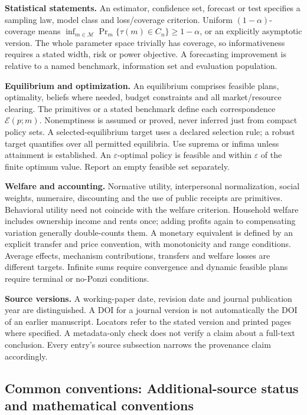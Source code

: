 \documentclass[11pt,a4paper]{article}
\begin{document}
\textbf{Statistical statements.} An estimator, confidence set, forecast or test specifies a sampling law, model class and loss/coverage criterion. Uniform \((1-\alpha)\)-coverage means \(\inf_{m\in\mathcal M}\Pr_m\{\tau(m)\in C_n\}\geq1-\alpha\), or an explicitly asymptotic version. The whole parameter space trivially has coverage, so informativeness requires a stated width, risk or power objective. A forecasting improvement is relative to a named benchmark, information set and evaluation population.

\textbf{Equilibrium and optimization.} An equilibrium comprises feasible plans, optimality, beliefs where needed, budget constraints and all market/resource clearing. The primitives or a stated benchmark define each correspondence \(\mathcal E(p;m)\). Nonemptiness is assumed or proved, never inferred just from compact policy sets. A selected-equilibrium target uses a declared selection rule; a robust target quantifies over all permitted equilibria. Use suprema or infima unless attainment is established. An \(\varepsilon\)-optimal policy is feasible and within \(\varepsilon\) of the finite optimum value. Report an empty feasible set separately.

\textbf{Welfare and accounting.} Normative utility, interpersonal normalization, social weights, numeraire, discounting and the use of public receipts are primitives. Behavioral utility need not coincide with the welfare criterion. Household welfare includes ownership income and rents once; adding profits again to compensating variation generally double-counts them. A monetary equivalent is defined by an explicit transfer and price convention, with monotonicity and range conditions. Average effects, mechanism contributions, transfers and welfare losses are different targets. Infinite sums require convergence and dynamic feasible plans require terminal or no-Ponzi conditions.

\textbf{Source versions.} A working-paper date, revision date and journal publication year are distinguished. A DOI for a journal version is not automatically the DOI of an earlier manuscript. Locators refer to the stated version and printed pages where specified. A metadata-only check does not verify a claim about a full-text conclusion. Every entry's source subsection narrows the provenance claim accordingly.

\subsection*{Common conventions: Additional-source status and mathematical conventions}
\end{document}
